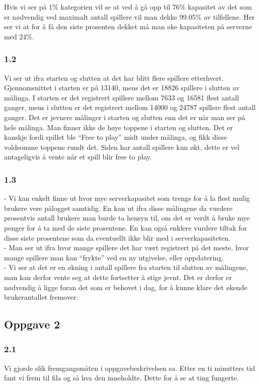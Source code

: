 \documentclass[a4paper, norsk, 12pt]{article}
\begin{document}
Hvis vi ser på 1\% kategorien vil se at ved å gå opp til 76\% kapasitet av det som er nødvendig ved maximalt antall spillere vil man dekke 99.05\% av tilfellene. Her ser vi at for å få den siste prosenten dekket må man øke kapasiteten på serverne med 24\%.

\subsubsection*{1.2}
Vi ser ut ifra starten og slutten at det har blitt flere spillere etterhvert. Gjennomsnittet i starten er på 13140, mens det er 18826 spillere i slutten av målinga. I starten er det registrert spillere mellom 7633 og 16581 flest antall ganger, mens i slutten er det registrert mellom 14000 og 24787 spillere flest antall ganger. Det er jevnere målinger i starten og slutten enn det er når man ser på hele målinga.  Man finner ikke de høye toppene i starten og slutten. Det er kanskje fordi spillet ble “Free to play” midt under målinga, og fikk disse voldsomme toppene rundt det. Siden har antall spillere kun økt, dette er vel antageligvis å vente når et spill blir free to play.

\subsubsection*{1.3}
- Vi kan enkelt finne ut hvor mye serverkapasitet som trengs for å la flest mulig brukere vere pålogget samtidig. En kan ut ifra disse målingene da vurdere prosentvis antall brukere man burde ta hensyn til, om det er verdt å bruke mye penger for å ta med de siste prosentene. En kan også enklere vurdere tiltak for disse siste prosentene som da eventuellt ikke blir med i serverkapasiteten.\\

- Man ser ut ifra hvor mange spillere det har vært registrert på det meste, hvor mange spillere man kan “frykte” ved en ny utgivelse, eller oppdatering.\\

- Vi ser at det er en økning i antall spillere fra starten til slutten av målingene, man kan derfor vente seg at dette fortsetter å stige jevnt. Det er derfor er nødvendig å ligge foran det som er behovet i dag, for å kunne klare det økende brukerantallet fremover.


\subsection{Oppgave 2}
\subsubsection*{2.1}
Vi gjorde slik fremgangsmåten i oppgavebeskrivelsen sa. Etter en ti minutters tid fant vi frem til fila og så hva den inneholdte. Dette for å se at ting fungerte.\\
\end{document}
